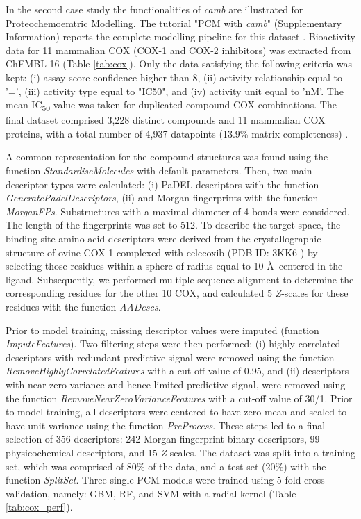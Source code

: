 \documentclass{bmcart}
\begin{document}
In the second case study the functionalities of {\it camb} are illustrated for Proteochemoemtric Modelling.
The tutorial "PCM with {\it camb}" (Supplementary Information) reports the complete modelling pipeline for this dataset \cite{cortesCOX}. 
Bioactivity data for 11 mammalian COX (COX-1 and COX-2 inhibitors) was extracted from ChEMBL 16 \cite{chembl, cortesCOX} (Table \ref{tab:cox}).
Only the data satisfying the following criteria was kept:
(i) assay score confidence higher than 8,
(ii) activity relationship equal to '=',
(iii) activity type equal to "IC50",
and (iv) activity unit equal to 'nM'.
The mean IC\textsubscript{50} value was taken for duplicated compound-COX combinations.
The final dataset comprised 3,228 distinct compounds and 11 mammalian COX proteins,  
with a total number of 4,937 datapoints (13.9\% matrix completeness) \cite{cortesCOX}.

A common representation for the compound structures was found using the function 
{\it StandardiseMolecules} with default parameters.
Then, two main descriptor types were calculated: (i) PaDEL descriptors \cite{padel} with the function {\it GeneratePadelDescriptors},
(ii) and Morgan fingerprints with the function {\it MorganFPs}.
Substructures with a maximal diameter of 4 bonds were considered.
The length of the fingerprints was set to 512.
To describe the target space, the binding site amino acid descriptors were derived
from the crystallographic structure of ovine COX-1 complexed with celecoxib (PDB ID: 3KK6 \cite{pdb_cox})
by selecting those residues within a sphere of radius equal to 10 \AA \ centered in the ligand.
Subsequently, we performed multiple sequence alignment to determine the corresponding 
residues for the other 10 COX, and calculated 5 {\it Z}-scales for these residues with the function {\it AADescs}. 

Prior to model training, missing descriptor values were imputed (function {\it ImputeFeatures}).
Two filtering steps were then performed: (i) highly-correlated descriptors with redundant predictive signal were removed using the function 
{\it RemoveHighlyCorrelatedFeatures} with a cut-off value of 0.95, and (ii) descriptors with near zero variance
and hence limited predictive signal, were removed using the function {\it RemoveNearZeroVarianceFeatures} with a cut-off value of 30/1.
Prior to model training, all descriptors were centered to have zero mean and scaled to have unit variance using the function {\it PreProcess}.
These steps led to a final selection of 356 descriptors: 242 Morgan fingerprint binary descriptors, 
99 physicochemical descriptors, and 15 {\it Z}-scales.
The dataset was split into a training set, which was comprised of 80\% of the data, and a test set (20\%) with the function {\it SplitSet}.
Three single PCM models were trained using 5-fold cross-validation, namely: GBM, RF, and SVM with a radial kernel (Table \ref{tab:cox_perf}).
\end{document}
